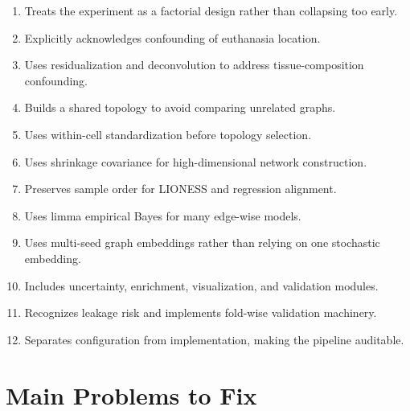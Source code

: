 \documentclass[11pt]{article}
\begin{document}
\begin{enumerate}[leftmargin=1.5em]
    \item Treats the experiment as a factorial design rather than collapsing too early.
    \item Explicitly acknowledges confounding of euthanasia location.
    \item Uses residualization and deconvolution to address tissue-composition confounding.
    \item Builds a shared topology to avoid comparing unrelated graphs.
    \item Uses within-cell standardization before topology selection.
    \item Uses shrinkage covariance for high-dimensional network construction.
    \item Preserves sample order for LIONESS and regression alignment.
    \item Uses limma empirical Bayes for many edge-wise models.
    \item Uses multi-seed graph embeddings rather than relying on one stochastic embedding.
    \item Includes uncertainty, enrichment, visualization, and validation modules.
    \item Recognizes leakage risk and implements fold-wise validation machinery.
    \item Separates configuration from implementation, making the pipeline auditable.
\end{enumerate}

\section{Main Problems to Fix}
\end{document}
